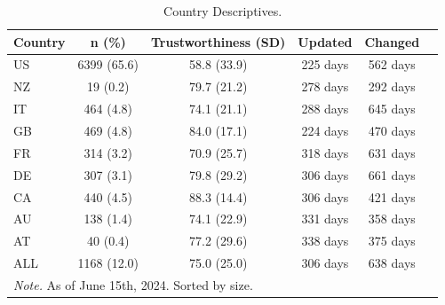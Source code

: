 \begin{table}[H]
\centering
\caption{Country Descriptives.}
\label{table:table2}
\begin{tabularx}{\textwidth}{ X c c c c c }
\toprule
Country &      n (\%) & Trustworthiness (SD) &  Updated &  Changed \\
\midrule
     US & 6399 (65.6) &          58.8 (33.9) & 225 days & 562 days \\
     NZ &    19 (0.2) &          79.7 (21.2) & 278 days & 292 days \\
     IT &   464 (4.8) &          74.1 (21.1) & 288 days & 645 days \\
     GB &   469 (4.8) &          84.0 (17.1) & 224 days & 470 days \\
     FR &   314 (3.2) &          70.9 (25.7) & 318 days & 631 days \\
     DE &   307 (3.1) &          79.8 (29.2) & 306 days & 661 days \\
     CA &   440 (4.5) &          88.3 (14.4) & 306 days & 421 days \\
     AU &   138 (1.4) &          74.1 (22.9) & 331 days & 358 days \\
     AT &    40 (0.4) &          77.2 (29.6) & 338 days & 375 days \\
    ALL & 1168 (12.0) &          75.0 (25.0) & 306 days & 638 days \\
\bottomrule
\multicolumn{3}{l}{\textit{Note.} As of June 15th, 2024. Sorted by size.}
\end{tabularx}
\end{table}
